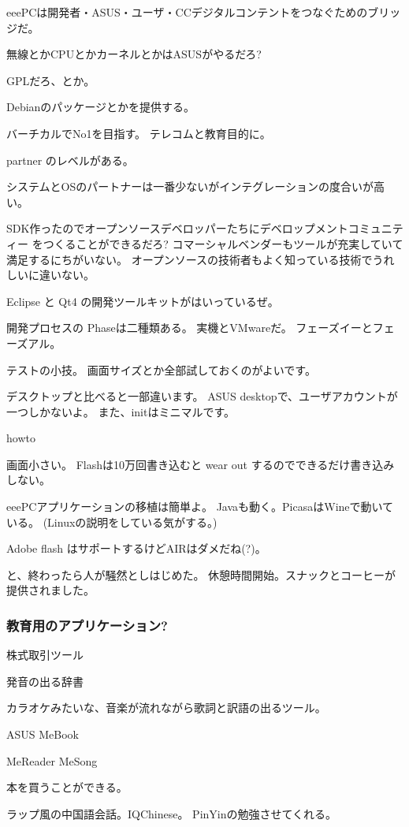 \documentclass[mingoth,a4paper]{jsarticle}
\begin{document}
eeePCは開発者・ASUS・ユーザ・CCデジタルコンテントをつなぐためのブリッジだ。

無線とかCPUとかカーネルとかはASUSがやるだろ?

GPLだろ、とか。

Debianのパッケージとかを提供する。

バーチカルでNo1を目指す。
テレコムと教育目的に。

partner のレベルがある。

システムとOSのパートナーは一番少ないがインテグレーションの度合いが高い。

SDK作ったのでオープンソースデベロッパーたちにデベロップメントコミュニティー
をつくることができるだろ?
コマーシャルベンダーもツールが充実していて満足するにちがいない。
オープンソースの技術者もよく知っている技術でうれしいに違いない。

Eclipse と Qt4 の開発ツールキットがはいっているぜ。

開発プロセスの
Phaseは二種類ある。
実機とVMwareだ。
フェーズイーとフェーズアル。


テストの小技。
画面サイズとか全部試しておくのがよいです。

デスクトップと比べると一部違います。
ASUS desktopで、ユーザアカウントが一つしかないよ。
また、initはミニマルです。

howto 

画面小さい。
Flashは10万回書き込むと wear out するのでできるだけ書き込みしない。

eeePCアプリケーションの移植は簡単よ。
Javaも動く。PicasaはWineで動いている。
(Linuxの説明をしている気がする。)

Adobe flash はサポートするけどAIRはダメだね(?)。


と、終わったら人が騒然としはじめた。
休憩時間開始。スナックとコーヒーが提供されました。

\subsubsection{教育用のアプリケーション?}

株式取引ツール

発音の出る辞書

カラオケみたいな、音楽が流れながら歌詞と訳語の出るツール。

ASUS MeBook

MeReader MeSong


本を買うことができる。

ラップ風の中国語会話。IQChinese。
PinYinの勉強させてくれる。
\end{document}
